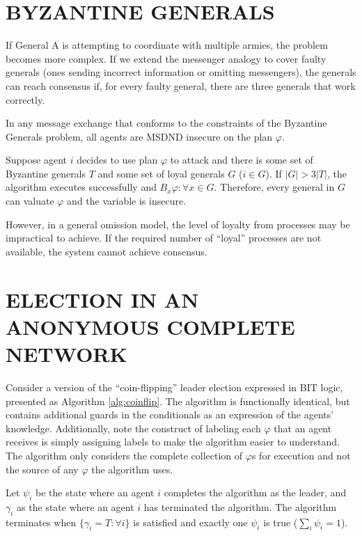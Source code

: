 \section{BYZANTINE GENERALS}

If General A is attempting to coordinate with multiple armies, the problem becomes more complex.
If we extend the messenger analogy to cover faulty generals (ones sending incorrect information or omitting messengers), the generals can reach consensus if, for every faulty general, there are three generals that work correctly.\cite{byzantine-generals}

\begin{thm}
In any message exchange that conforms to the constraints of the Byzantine Generals problem, all agents are MSDND insecure on the plan $\varphi$.
\end{thm}
\begin{prooftight}
Suppose agent $i$ decides to use plan $\varphi$ to attack and there is some set of Byzantine generals $T$ and some set of loyal generals $G$ ($i \in G$). If $|G| > 3|T|$, the algorithm executes successfully and $B_x \varphi : \forall x \in G$. Therefore, every general in $G$ can valuate $\varphi$ and the variable is insecure.
\end{prooftight}

However, in a general omission model, the level of loyalty from processes may be impractical to achieve.
If the required number of ``loyal'' processes are not available, the system cannot achieve consensus.

\section{ELECTION IN AN ANONYMOUS COMPLETE NETWORK}


Consider a version of the ``coin-flipping'' leader election expressed in BIT logic, presented as Algorithm \ref{alg:coinflip}.
The algorithm is functionally identical, but contains additional guards in the conditionals as an expression of the agents' knowledge.
Additionally, note the construct of labeling each $\varphi$ that an agent receives is simply assigning labels to make the algorithm easier to understand.
The algorithm only considers the complete collection of $\varphi$s for execution and not the source of any $\varphi$ the algorithm uses.

Let $\psi_i$ be the state where an agent $i$ completes the algorithm as the leader, and $\gamma_i$ as the state where an agent $i$ has terminated the algorithm.
The algorithm terminates when $\{\gamma_i = T : \forall i \}$ is satisfied and exactly one $\psi_i$ is true ($\sum_i \psi_i = 1$).

